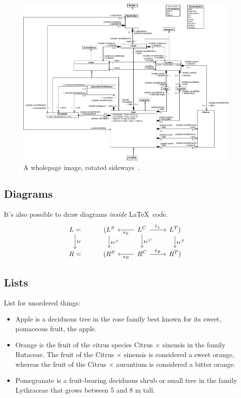 \begin{figure}
\centering
\includegraphics[width=\maxwidth{\textwidth}]{figures/omgfsm.png}
\caption{A wholepage image, rotated sideways~\cite{omguml}.}
\label{fig:omgfsm}
\end{figure}

\subsection{Diagrams}
It's also possible to draw diagrams \textit{inside} \LaTeX\ code.
\[
\begin{tikzcd}
L\arrow{d}{tr} = & (L^S \arrow{d}{tr^S} &   \arrow{l}{s_L}  L^C\arrow{d}{tr^C} \arrow{r}{t_L} & L^T \arrow{d}{tr^T}) \\
R = & (R^S & \arrow{l}{s_R} R^C \arrow{r}{t_R} & R^T)
\end{tikzcd}
\]

\clearpage
\subsection{Lists}
List for unordered things:
\begin{itemize}
\item Apple is a deciduous tree in the rose family best known for its sweet, pomaceous fruit, the apple.
\item Orange is the fruit of the citrus species Citrus $\times$ sinensis in the family Rutaceae. The fruit of the Citrus $\times$ sinensis is considered a sweet orange, whereas the fruit of the Citrus $\times$ aurantium is considered a bitter orange.
\item Pomegranate is a fruit-bearing deciduous shrub or small tree in the family Lythraceae that grows between 5 and 8 m tall.
\end{itemize}


